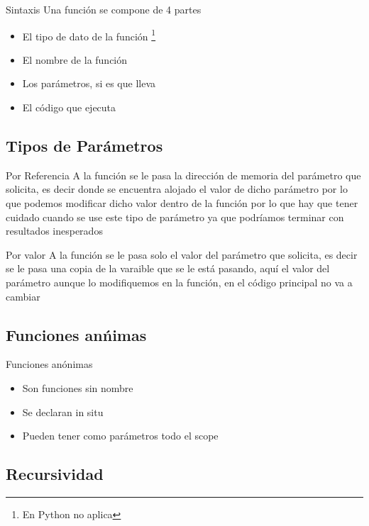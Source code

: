 \documentclass{beamer}
\begin{document}
\begin{frame}{Sintaxis}
	Una funci\'on se compone de 4 partes
	\begin{itemize}
		\item El tipo de dato de la funci\'on \footnote{En Python no aplica}
		\item El nombre de la funci\'on
		\item Los par\'ametros, si es que lleva
		\item El c\'odigo que ejecuta
	\end{itemize}
\end{frame}

\subsection{Tipos de Par\'ametros}

\begin{frame}{Por Referencia}
	A la funci\'on se le pasa la direcci\'on de memoria del par\'ametro que solicita, es decir donde se encuentra alojado el valor de dicho par\'ametro por lo que podemos modificar dicho valor dentro de la funci\'on por lo que hay que tener cuidado cuando se use este tipo de par\'ametro ya que podr\'iamos terminar con resultados inesperados
\end{frame}

\begin{frame}{Por valor}
	A la funci\'on se le pasa solo el valor del par\'ametro que solicita, es decir se le pasa una copia de la varaible que se le est\'a pasando, aqu\'i el valor del par\'ametro aunque lo modifiquemos en la funci\'on, en el c\'odigo principal no va a cambiar
\end{frame}

\subsection{Funciones an\'nimas}

\begin{frame}{Funciones an\'onimas}
	\begin{itemize}
		\item Son funciones sin nombre
		\item Se declaran in situ
		\item Pueden tener como par\'ametros todo el scope
	\end{itemize}
\end{frame}

\subsection{Recursividad}
\end{document}
